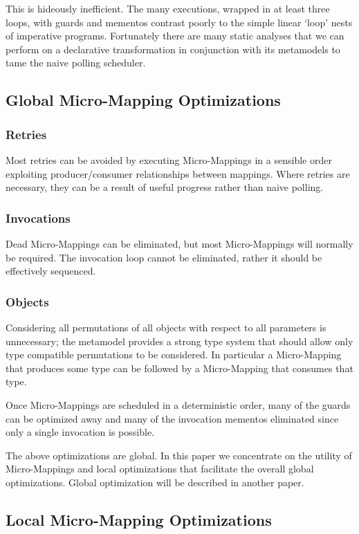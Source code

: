 \documentclass[conference]{IEEEtran}
\begin{document}
This is hideously inefficient. The many executions, wrapped in at least three loops, with guards and mementos contrast poorly to the simple linear `loop' nests of imperative programs. Fortunately there are many static analyses that we can perform on a declarative transformation in conjunction with its metamodels to tame the naive polling scheduler.

\subsection{Global Micro-Mapping Optimizations}\label{Global Micro-Mapping Optimizations}

\subsubsection{Retries}Most retries can be avoided by executing Micro-Mappings in a sensible order exploiting producer/consumer relationships between mappings. Where retries are necessary, they can be a result of useful progress rather than naive polling.

\subsubsection{Invocations}Dead Micro-Mappings can be eliminated, but most Micro-Mappings will normally be required. The invocation loop cannot be eliminated, rather it should be effectively sequenced.

\subsubsection{Objects}Considering all permutations of all objects with respect to all parameters is unnecessary; the metamodel provides a strong type system that should allow only type compatible permutations to be considered. In particular a Micro-Mapping that produces some type can be followed by a Micro-Mapping that consumes that type.

Once Micro-Mappings are scheduled in a deterministic order, many of the guards can be optimized away and many of the invocation mementos eliminated since only a single invocation is possible.

The above optimizations are global. In this paper we concentrate on the utility of Micro-Mappings and local optimizations that facilitate the overall global optimizations. Global optimization will be described in another paper.
  
\subsection{Local Micro-Mapping Optimizations}
\end{document}
